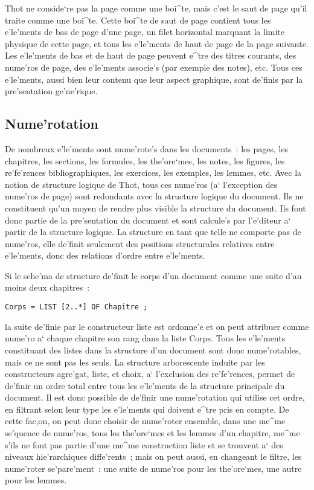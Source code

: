 {Thot ne conside`re pas la page comme une boi^te, mais c'est le saut de page
qu'il traite comme une boi^te. Cette boi^te de saut de page contient tous
les e'le'ments de bas de page d'une page, un filet horizontal marquant la limite
physique de cette page, et tous les e'le'ments de haut de page de la page
suivante. Les e'le'ments de bas et de haut de page peuvent e^tre des titres
courants, des nume'ros de page, des e'le'ments associe's (par exemple des notes),
etc. Tous ces e'le'ments, aussi bien leur contenu que leur aspect graphique,
sont de'finis par la pre'sentation ge'ne'rique.

\subsection{Nume'rotation}

De nombreux e'le'ments sont nume'rote's dans les documents~: les pages, les
chapitres, les sections, les formules, les the'ore`mes, les notes, les figures,
les re'fe'rences bibliographiques, les exercices, les exemples, les lemmes, etc.
Avec la notion de structure logique de Thot, tous ces nume'ros (a` l'exception
des nume'ros de page) sont redondants avec la structure logique du document.
Ils ne constituent qu'un moyen de rendre plus visible la structure du
document. Ils font donc partie de la pre'sentation du document et sont calcule's
par l'e'diteur a` partir de la structure logique. La structure en tant que
telle ne comporte pas de nume'ros, elle de'finit seulement des positions
structurales relatives entre e'le'ments, donc des relations d'ordre entre
e'le'ments.

Si le sche'ma de structure de'finit le corps d'un document comme une suite
d'au moins deux chapitres~:
\begin{verbatim}
Corps = LIST [2..*] OF Chapitre ;
\end{verbatim}
la suite de'finie par le constructeur liste est ordonne'e et on peut
attribuer comme nume'ro a` chaque chapitre son rang dans la liste Corps.
Tous les e'le'ments constituant des listes dans la structure d'un document
sont donc nume'rotables, mais ce ne sont pas les seuls. La structure
arborescente induite par les constructeurs agre'gat, liste, et choix, a`
l'exclusion des re'fe'rences, permet de de'finir un ordre total entre tous
les e'le'ments de la structure principale du document. Il est donc possible
de de'finir une nume'rotation qui utilise cet ordre, en filtrant selon leur
type les e'le'ments qui doivent e^tre pris en compte. De cette fac,on, on
peut donc choisir de nume'roter ensemble, dans une me^me se'quence de nume'ros,
tous les the'ore`mes et les lemmes d'un chapitre, me^me s'ils ne font pas
partie d'une me^me construction liste et se trouvent a` des niveaux
hie'rarchiques diffe'rents~; mais on peut aussi, en changeant le filtre, les
nume'roter se'pare'ment~: une suite de nume'ros pour les the'ore`mes, une autre
pour les lemmes.

}

